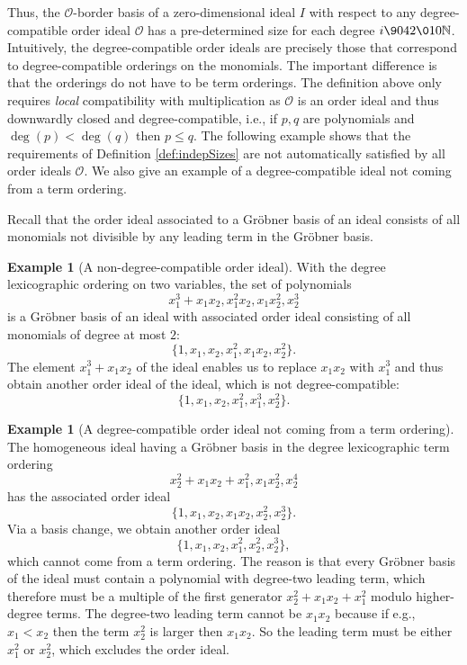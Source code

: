 \documentclass[11pt,oneside,english]{amsart}
\makeatletter
\numberwithin{equation}{section}
\numberwithin{figure}{section}
\theoremstyle{plain}
\theoremstyle{definition}
\theoremstyle{definition}
\newtheorem{example}[thm]{Example}
\theoremstyle{remark}
\theoremstyle{plain}
\theoremstyle{plain}
\theoremstyle{plain}
\theoremstyle{problem@}
\makeatother
\begin{document}
Thus, the ${\mathcal{O}}$-border basis of a zero-dimensional ideal $I$ with
respect to any degree-compatible order ideal ${\mathcal{O}}$ has a pre-determined
size for each degree $i{\9042\010}{\mathbb{N}}$. Intuitively, the degree-compatible
order ideals are precisely those that correspond to degree-compatible
orderings on the monomials. The important difference is that the orderings
do not have to be term orderings. The definition above only requires
\emph{local} compatibility with multiplication as ${\mathcal{O}}$ is an order
ideal and thus downwardly closed and degree-compatible, i.e., if $p,q$
are polynomials and $\deg(p)<\deg(q)$ then $p\leq q$. The following
example shows that the requirements of Definition \ref{def:indepSizes}
are not automatically satisfied by all order ideals ${\mathcal{O}}$. 
We also give an example of a degree-compatible ideal
not coming from a term ordering.

Recall that the order ideal associated to a Gröbner basis of an ideal
consists of all monomials not divisible by
any leading term in the Gröbner basis.
\begin{example}[A non-degree-compatible order ideal]
With the degree lexicographic ordering on two variables,
the set of polynomials
\[ x_1^3 + x_1 x_2, x_1^2 x_2, x_1 x_2^2, x_2^3\]
is a Gröbner basis of an ideal with associated order ideal
consisting of all monomials of degree at most \(2\):
\[ \{ 1, x_1, x_2, x_1^2, x_1 x_2, x_2^2 \}. \]
The element \(x_1^3 + x_1 x_2\) of the ideal enables us
to replace \(x_1 x_2\) with \(x_1^3\) and thus obtain another
order ideal of the ideal, which is not degree-compatible:
\[ \{ 1, x_1, x_2, x_1^2, x_1^3, x_2^2 \}. \]
\end{example}

\begin{example}[A degree-compatible order ideal not coming from a term ordering]
The homogeneous ideal having a Gröbner basis
in the degree lexicographic term ordering
\[ x_2^2 + x_1 x_2 + x_1^2, x_1x_2^2,x_2^4 \]
has the associated order ideal
\[ \{ 1, x_1, x_2, x_1 x_2, x_2^2, x_2^3 \}. \]
Via a basis change, we obtain another order ideal
\[  \{ 1, x_1, x_2, x_1^2, x_2^2, x_2^3 \}, \]
which cannot come from a term ordering.
The reason is that every Gröbner basis of the ideal must contain
a polynomial with degree-two leading term, which therefore
must be a multiple of the first generator
\(x_2^2 + x_1 x_2 + x_1^2\)
modulo higher-degree terms.
The degree-two leading term cannot be \(x_1 x_2\) because
if e.g., \(x_1 < x_2\) then the term \(x_2^2\) is larger then \(x_1 x_2\).
So the leading term must be either \(x_1^2\) or \(x_2^2\),
which excludes the order ideal.
\end{example}
\end{document}
